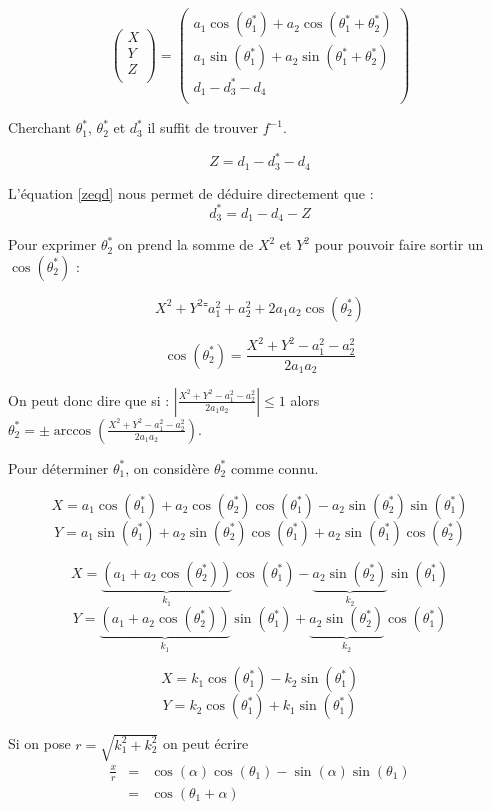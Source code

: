 \documentclass[]{article}
\begin{document}
\[
  \begin{pmatrix}
    X\\
    Y\\
    Z\\
  \end{pmatrix}
  = 
  \begin{pmatrix}
    a_1 \cos (\theta^*_1)+a_2 \cos(\theta^*_1+\theta^*_2) \\
    a_1 \sin (\theta^*_1)+a_2 \sin(\theta^*_1+\theta^*_2) \\
    d_1-d^*_3-d_4 \\
  \end{pmatrix}
\]

Cherchant $\theta^*_1$, $\theta^*_2$ et $d^*_3$ il suffit de trouver
$f^{-1}$.

\begin{equation}
  Z = d_1-d^*_3-d_4
  \label{zeqd}
\end{equation}

L'équation \eqref{zeqd} nous permet de déduire directement que : 
\[
  d^*_3 = d_1-d_4-Z
\]

Pour exprimer $\theta^*_2$ on prend la somme de $X^2$ et
$Y^2$ pour pouvoir faire sortir un $\cos(\theta^*_2)$ :

\[
  X^2 + Y^2 ⁼ a^2_1 + a^2_2 + 2 a_1 a_2 \cos(\theta^*_2) 
\]

\[ 
  \cos(\theta^*_2) = \frac{X^2+Y^2-a_1^2-a_2^2}{2 a_1 a_2} 
\]

On peut donc dire que si :
$| \frac{X^2+Y^2-a_1^2-a_2^2}{2 a_1 a_2} | \leq 1$ alors
$\theta^*_2 = \pm \arccos(\frac{X^2+Y^2-a_1^2-a_2^2}{2 a_1 a_2})$. 

Pour déterminer $\theta^*_1$, on considère $\theta^*_2$ comme connu.

\[ 
  X = a_1\cos(\theta^*_1)+a_2\cos(\theta^*_2)\cos(\theta^*_1)-a_2\sin(\theta^*_2)\sin(\theta^*_1)
\]
\[
  Y = a_1\sin(\theta^*_1)+a_2\sin(\theta^*_2)\cos(\theta^*_1)+a_2\sin(\theta^*_1)\cos(\theta^*_2)
\]

\[ 
  X = \underbrace{(a_1+a_2\cos(\theta^*_2))}_{k_1}\cos(\theta^*_1)-\underbrace{a_2\sin(\theta^*_2)}_{k_2}\sin(\theta^*_1)
\]
\[
  Y = \underbrace{(a_1+a_2\cos(\theta^*_2))}_{k_1}\sin(\theta^*_1)+\underbrace{a_2\sin(\theta^*_2)}_{k_2}\cos(\theta^*_1)
\]

\[ 
  X = k_1\cos(\theta^*_1)-k_2\sin(\theta^*_1)
\]
\[ 
  Y = k_2\cos(\theta^*_1)+k_1\sin(\theta^*_1)
\]

Si on pose $r = \sqrt{k_1^2+k_2^2}$ on peut écrire 
\[
\begin{array}{lcl} 
  \frac{x}{r} & = & \cos(\alpha)\cos(\theta_1)-\sin(\alpha)\sin(\theta_1)\\
  & = & \cos(\theta_1+\alpha)
\end{array}
\]
\end{document}
